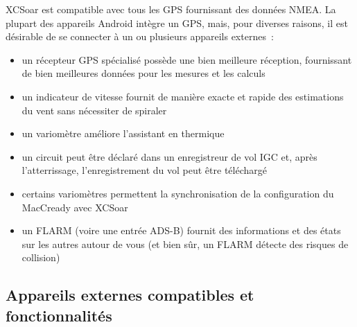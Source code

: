 XCSoar est compatible avec tous les GPS fournissant des données NMEA. La plupart
des appareils Android intègre un GPS, mais, pour diverses raisons, il est désirable de
se connecter à un ou plusieurs appareils externes~:
\begin{itemize}
\item un récepteur GPS spécialisé possède une bien meilleure réception, fournissant de bien
meilleures données pour les mesures et les calculs
\item un indicateur de vitesse fournit de manière exacte et rapide des estimations du vent
 sans nécessiter de spiraler
\item un variomètre améliore l'assistant en thermique
\item un circuit peut être déclaré dans un enregistreur de vol IGC et, après l'atterrissage, l'enregistrement
du vol peut être téléchargé
\item certains variomètres permettent la synchronisation de la configuration du MacCready avec
 XCSoar
\item un FLARM (voire une entrée ADS-B) fournit des informations et des états sur les autres
autour de vous (et bien sûr, un FLARM détecte des risques de collision)
\end{itemize}

\subsection*{Appareils externes compatibles et fonctionnalités}
\label{sec:supported-varios}

\newcommand{\y}[0]{{ $\surd$ }}
\noindent{}

